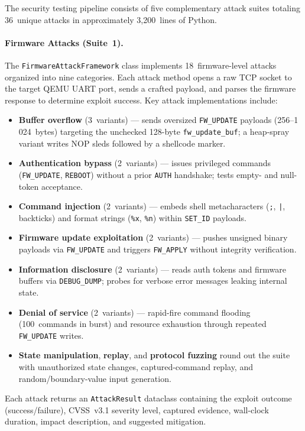The security testing pipeline consists of five complementary attack
suites totaling 36~unique attacks in approximately 3{,}200~lines
of Python.

\paragraph{Firmware Attacks (Suite~1).}
The \texttt{FirmwareAttackFramework} class implements 18~firmware-level
attacks organized into nine categories.
Each attack method opens a raw TCP socket to the target QEMU UART
port, sends a crafted payload, and parses the firmware response
to determine exploit success.
Key attack implementations include:
\begin{itemize}[leftmargin=*]
  \item \textbf{Buffer overflow} (3~variants) --- sends oversized
    \texttt{FW\_UPDATE} payloads (256--1\,024~bytes) targeting the
    unchecked 128-byte \texttt{fw\_update\_buf}; a heap-spray variant
    writes NOP sleds followed by a shellcode marker.
  \item \textbf{Authentication bypass} (2~variants) --- issues
    privileged commands (\texttt{FW\_UPDATE}, \texttt{REBOOT}) without
    a prior \texttt{AUTH} handshake; tests empty- and null-token
    acceptance.
  \item \textbf{Command injection} (2~variants) --- embeds shell
    metacharacters (\texttt{;}, \texttt{|}, backticks) and format
    strings (\texttt{\%x}, \texttt{\%n}) within \texttt{SET\_ID}
    payloads.
  \item \textbf{Firmware update exploitation} (2~variants) ---
    pushes unsigned binary payloads via \texttt{FW\_UPDATE} and
    triggers \texttt{FW\_APPLY} without integrity verification.
  \item \textbf{Information disclosure} (2~variants) --- reads
    auth tokens and firmware buffers via \texttt{DEBUG\_DUMP}; probes
    for verbose error messages leaking internal state.
  \item \textbf{Denial of service} (2~variants) --- rapid-fire
    command flooding (100~commands in burst) and resource exhaustion
    through repeated \texttt{FW\_UPDATE} writes.
  \item \textbf{State manipulation}, \textbf{replay}, and
    \textbf{protocol fuzzing} round out the suite with
    unauthorized state changes, captured-command replay, and
    random/boundary-value input generation.
\end{itemize}
Each attack returns an \texttt{AttackResult} dataclass containing
the exploit outcome (success/failure), CVSS~v3.1 severity level,
captured evidence, wall-clock duration, impact description, and
suggested mitigation.

